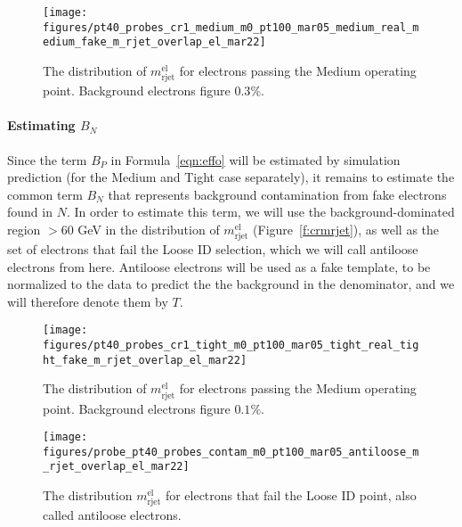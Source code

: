 \begin{figure}[H]
	\texttt{[image: figures/pt40\_probes\_cr1\_medium\_m0\_pt100\_mar05\_medium\_real\_medium\_fake\_m\_rjet\_overlap\_el\_mar22]}
	\centering

	\caption{The distribution of $m_{\text{rjet}}^{\text{el}}$ for electrons passing
		the Medium operating point. Background electrons figure $0.3\%$.}

	\label{f:eidmedium}

\end{figure}


\paragraph{Estimating $B_N$}

Since the term $B_P$ in Formula~\ref{eqn:effo} will be estimated by simulation
prediction (for the Medium and Tight case separately), it remains to estimate
the common term $B_N$ that represents background contamination from fake
electrons found in $N$. In order to estimate this term, we will use the
background-dominated region $> 60$ GeV in the distribution of
$m_{\text{rjet}}^{\text{el}}$ (Figure~\ref{f:crmrjet}), as well as the set of
electrons that fail the Loose ID selection, which we will call antiloose
electrons from here. Antiloose electrons will be used as a fake template, to be
normalized to the data to predict the the background in the denominator, and we
will therefore denote them by $T$.

\begin{figure}[H]
	\texttt{[image: figures/pt40\_probes\_cr1\_tight\_m0\_pt100\_mar05\_tight\_real\_tight\_fake\_m\_rjet\_overlap\_el\_mar22]}
	\centering

	\caption{The distribution of $m_{\text{rjet}}^{\text{el}}$ for electrons
		passing the Medium operating point. Background electrons figure $0.1\%$.}

	\label{f:eidtight}
	\centering
\end{figure}


\begin{figure}[H]
	\texttt{[image: figures/probe\_pt40\_probes\_contam\_m0\_pt100\_mar05\_antiloose\_m\_rjet\_overlap\_el\_mar22]}
	\centering
	\caption{The distribution $m_{\text{rjet}}^{\text{el}}$ for electrons that fail
		the Loose ID point, also called antiloose electrons.}
	\label{f:antiloosemrjet}
\end{figure}


